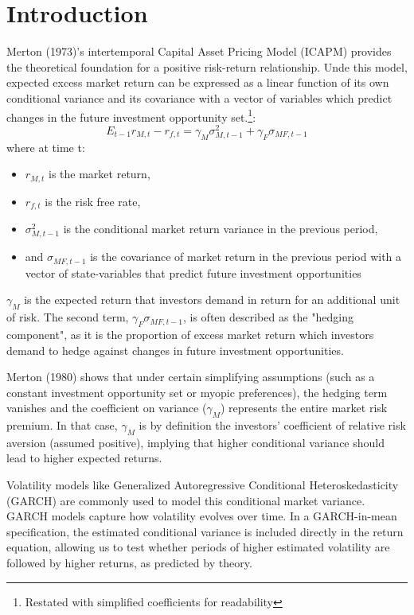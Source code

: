\documentclass[12pt]{article}
\begin{document}
\section{Introduction}
Merton (1973)'s intertemporal Capital Asset Pricing Model (ICAPM) provides the theoretical foundation for a positive risk-return relationship. Unde this model, expected excess market return can be expressed as a linear function of its own conditional variance and its covariance with a vector of variables which predict changes in the future investment opportunity set.\footnote{Restated with simplified coefficients for readability}: 
\begin{equation}
\nonumber
E_{t-1}r_{M,t}-r_{f,t}=\gamma_M\sigma_{M,t-1}^2+\gamma_F\sigma_{MF,t-1}
\end{equation}
\noindent where at time t:
\begin{itemize}
\item$r_{M,t}$ is the market return,
\item$r_{f,t}$ is the risk free rate,
\item$\sigma_{M,t-1}^2$ is the conditional market return variance in the previous period,
\item and $\sigma_{MF,t-1}$ is the covariance of market return in the previous period with a vector of state-variables that predict future investment opportunities
\end{itemize}
$\gamma_M$ is the expected return that investors demand in return for an additional unit of risk. The second term, $\gamma_F\sigma_{MF,t-1}$, is often described as the "hedging component", as it is the proportion of excess market return which investors demand to hedge against changes in future investment opportunities.\par
Merton (1980) shows that under certain simplifying assumptions (such as a constant investment opportunity set or myopic preferences), the hedging term vanishes and the coefficient on variance ($\gamma_M$) represents the entire market risk premium. In that case, $\gamma_M$ is by definition the investors' coefficient of relative risk aversion (assumed positive), implying that higher conditional variance should lead to higher expected returns. \par
Volatility models like Generalized Autoregressive Conditional Heteroskedasticity (GARCH) are commonly used to model this conditional market variance. GARCH models capture how volatility evolves over time. In a GARCH-in-mean specification, the estimated conditional variance is included directly in the return equation, allowing us to test whether periods of higher estimated volatility are followed by higher returns, as predicted by theory.\par
\end{document}
